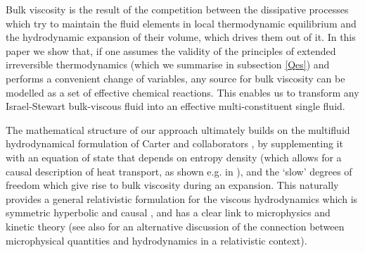 \documentclass[useAMS,usenatbib,prd,twocolumn,nofootinbib]{revtex4-1}
\begin{document}
Bulk viscosity is the result of the competition between the dissipative processes which try to maintain the fluid elements in local thermodynamic equilibrium and the hydrodynamic expansion of their volume, which drives them out of it. 
In this paper we show that, if one assumes the validity of the principles of extended irreversible thermodynamics (which we summarise in subsection \ref{Qes}) and performs a convenient change of variables, any source for bulk viscosity can be modelled as a set of effective chemical reactions. This enables us to transform any Israel-Stewart \citep{Israel_Stewart_1979} bulk-viscous fluid into an effective multi-constituent single fluid.

The mathematical structure of our approach ultimately builds on the multifluid hydrodynamical formulation of Carter and collaborators \citep{noto_rel, carter1991, Carter92, carterB98}, by supplementing it with an equation of state that depends on entropy density (which allows for a causal description of heat transport, as shown e.g. in \cite{carter_proc_88, Lopez09, Lopez11}), and the `slow' degrees of freedom which give rise to bulk viscosity during an expansion. This naturally provides a general relativistic formulation for the viscous hydrodynamics which is symmetric hyperbolic and causal \citep{Causality_bulk}, and has a clear link to microphysics and kinetic theory (see also \cite{AC15} for an alternative discussion of the connection between microphysical quantities and hydrodynamics in a relativistic context).
\end{document}
